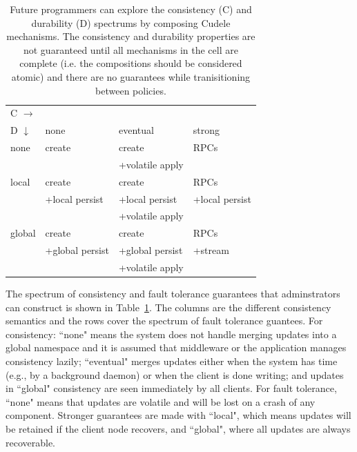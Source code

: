 \begin{table}[t]
\begin{center}
\caption{Future programmers can explore the consistency (C) and
durability (D) spectrums by composing Cudele mechanisms. The consistency
and durability properties are not guaranteed until all mechanisms in the cell
are complete (i.e. the compositions should be considered atomic) and there are
no guarantees while tranisitioning between policies. \label{table:spectrum}}
\begin{tabular}{ l | l | l | l }
  C \(\rightarrow\) &&& \\  
  D \(\downarrow\)  & none              & eventual        & strong  \\\hline
  none                       & create            & create          & RPCs    \\
                             &                   & +volatile apply &         \\\hdashline
  local                      & create            & create          & RPCs    \\
                             & +local persist    & +local persist  & +local persist \\
                             &                   & +volatile apply &         \\\hdashline
  global                     & create            & create          & RPCs    \\
                             & +global persist   & +global persist & +stream \\
                             &                   & +volatile apply &         \\
\end{tabular}
\end{center}
\end{table}

The spectrum of consistency and fault tolerance guarantees that adminstrators
can construct is shown in Table~\ref{table:spectrum}. The columns are the
different consistency semantics and the rows cover the spectrum of fault
tolerance guantees. For consistency: ``none" means the system does not handle
merging updates into a global namespace and it is assumed that middleware or
the application manages consistency lazily; ``eventual" merges updates either
when the system has time (e.g., by a background daemon) or when the client is
done writing; and updates in ``global" consistency are seen immediately by all
clients. For fault tolerance, ``none" means that updates are volatile and will
be lost on a crash of any component. Stronger guarantees are made with
``local", which means updates will be retained if the client node recovers, and
``global", where all updates are always recoverable.

